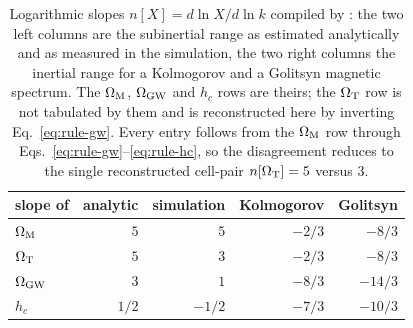 \documentclass[10pt,prd,aps,nobibnotes,superscriptaddress,preprintnumbers,notitlepage]{revtex4-1}
\begin{document}
\begin{table}[ht]
  \centering
  \begin{tabular}{l r r r r}
    \hline\hline
    slope of & analytic & simulation & Kolmogorov & Golitsyn \\
    \hline
    $\Omega_{\rm M}$  & $5$   & $5$    & $-2/3$ & $-8/3$  \\
    $\Omega_{\rm T}$  & $5$   & $3$    & $-2/3$ & $-8/3$  \\
    $\Omega_{\rm GW}$ & $3$   & $1$    & $-8/3$ & $-14/3$ \\
    $h_c$             & $1/2$ & $-1/2$ & $-7/3$ & $-10/3$ \\
    \hline\hline
  \end{tabular}
  \caption{Logarithmic slopes $n[X]=d\ln X/d\ln k$ compiled by \cite{RoperPol:2019wvy}: the two
  left columns are the subinertial range as estimated analytically and as measured in the
  simulation, the two right columns the inertial range for a Kolmogorov and a Golitsyn
  magnetic spectrum. The $\Omega_{\rm M}$, $\Omega_{\rm GW}$ and $h_c$ rows are theirs; the
  $\Omega_{\rm T}$ row is not tabulated by them and is reconstructed here by inverting
  Eq.~\eqref{eq:rule-gw}. Every entry follows from the $\Omega_{\rm M}$ row through
  Eqs.~\eqref{eq:rule-gw}--\eqref{eq:rule-hc}, so the disagreement reduces to the single
  reconstructed cell-pair $n[\Omega_{\rm T}]=5$ versus $3$.}
  \label{tab:slope-bookkeeping}
\end{table}
\end{document}
